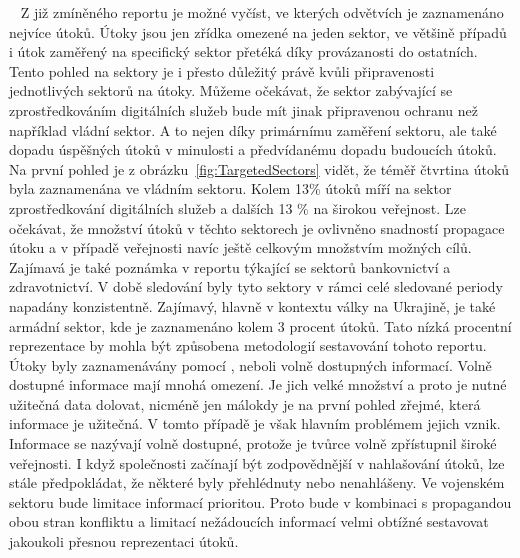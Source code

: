 ~
Z již zmíněného reportu\cite{Enisa_thread_landscape} je možné vyčíst, ve kterých odvětvích je zaznamenáno nejvíce útoků.
Útoky jsou jen zřídka omezené na jeden sektor, ve většině případů i útok zaměřený na specifický sektor přetéká díky provázanosti do ostatních.
Tento pohled na sektory je i přesto důležitý právě kvůli připravenosti jednotlivých sektorů na útoky.
Můžeme očekávat, že sektor zabývající se zprostředkováním digitálních služeb bude mít jinak připravenou ochranu než například vládní sektor.
A to nejen díky primárnímu zaměření sektoru, ale také dopadu úspěšných útoků v minulosti a předvídanému dopadu budoucích útoků.
Na první pohled je z obrázku~\ref{fig:TargetedSectors} vidět, že téměř čtvrtina útoků byla zaznamenána ve vládním sektoru.
Kolem 13\% útoků míří na sektor zprostředkování digitálních služeb a dalších 13 \% na širokou veřejnost.
Lze očekávat, že množství útoků v těchto sektorech je ovlivněno snadností propagace útoku a v případě veřejnosti navíc ještě celkovým množstvím možných cílů.
Zajímavá je také poznámka v reportu týkající se sektorů bankovnictví a zdravotnictví.
V době sledování byly tyto sektory v rámci celé sledované periody napadány konzistentně.
Zajímavý, hlavně v kontextu války na Ukrajině, je také armádní sektor, kde je zaznamenáno kolem 3 procent útoků.
Tato nízká procentní reprezentace by mohla být způsobena metodologií sestavování tohoto reportu.
Útoky byly zaznamenávány pomocí , neboli volně dostupných informací\cite{moje_bakalarka}.
Volně dostupné informace mají mnohá omezení.
Je jich velké množství a proto je nutné užitečná data dolovat, nicméně jen málokdy je na první pohled zřejmé, která informace je užitečná.
V tomto případě je však hlavním problémem jejich vznik.
Informace se nazývají volně dostupné, protože je tvůrce volně zpřístupnil široké veřejnosti.
I když společnosti začínají být zodpovědnější v nahlašování útoků, lze stále předpokládat, že některé byly přehlédnuty nebo nenahlášeny.
Ve vojenském sektoru bude limitace informací prioritou.
Proto bude v kombinaci s propagandou obou stran konfliktu a limitací nežádoucích informací velmi obtížné sestavovat jakoukoli přesnou reprezentaci útoků.


